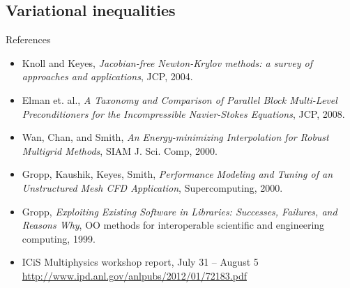 \documentclass{beamer}
\begin{document}
\subsection{Variational inequalities}



\begin{frame}{References}
  \begin{itemize}
  \item Knoll and Keyes, \emph{Jacobian-free Newton-Krylov methods: a survey of approaches and applications}, JCP, 2004.
  \item Elman et. al., \emph{A Taxonomy and Comparison of Parallel Block Multi-Level Preconditioners for the Incompressible Navier-Stokes Equations}, JCP, 2008.
  \item Wan, Chan, and Smith, \emph{An Energy-minimizing Interpolation for Robust Multigrid Methods}, SIAM J. Sci. Comp, 2000.
  \item Gropp, Kaushik, Keyes, Smith, \emph{Performance Modeling and Tuning of an Unstructured Mesh CFD Application}, Supercomputing, 2000.
  \item Gropp, \emph{Exploiting Existing Software in Libraries: Successes, Failures, and Reasons Why}, OO methods for interoperable scientific and engineering computing, 1999.
  \item ICiS Multiphysics workshop report, July 31 -- August 5 \\
    \url{http://www.ipd.anl.gov/anlpubs/2012/01/72183.pdf}
  \end{itemize}
\end{frame}
\end{document}
